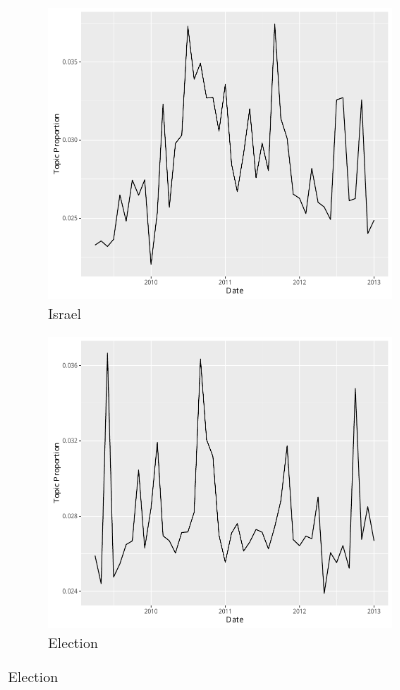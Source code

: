 \documentclass[12pt]{article}
\theoremstyle{definition}
\theoremstyle{algodesc}
\begin{document}
\begin{figure}[htb]
\centering
\begin{subfigure}[Israel]{.30\linewidth}
    \includegraphics[width=\linewidth]{../images/time_plot6.pdf}
    \caption{Israel} \label{fig:t1}
\end{subfigure}
\begin{subfigure}[Election]{.30\linewidth}
    \includegraphics[width=\linewidth]{../images/time_plot11.pdf}
    \caption{Election} \label{fig:t2}
\end{subfigure}

\end{figure}
\end{document}
